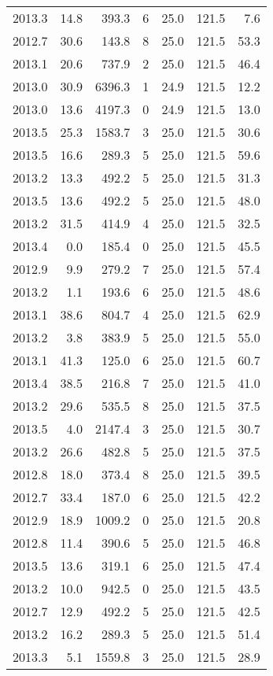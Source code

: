\begin{tabular}{rrrrrrr}
2013.3 & 14.8 & 393.3 & 6 & 25.0 & 121.5 & 7.6 \\
2012.7 & 30.6 & 143.8 & 8 & 25.0 & 121.5 & 53.3 \\
2013.1 & 20.6 & 737.9 & 2 & 25.0 & 121.5 & 46.4 \\
2013.0 & 30.9 & 6396.3 & 1 & 24.9 & 121.5 & 12.2 \\
2013.0 & 13.6 & 4197.3 & 0 & 24.9 & 121.5 & 13.0 \\
2013.5 & 25.3 & 1583.7 & 3 & 25.0 & 121.5 & 30.6 \\
2013.5 & 16.6 & 289.3 & 5 & 25.0 & 121.5 & 59.6 \\
2013.2 & 13.3 & 492.2 & 5 & 25.0 & 121.5 & 31.3 \\
2013.5 & 13.6 & 492.2 & 5 & 25.0 & 121.5 & 48.0 \\
2013.2 & 31.5 & 414.9 & 4 & 25.0 & 121.5 & 32.5 \\
2013.4 & 0.0 & 185.4 & 0 & 25.0 & 121.5 & 45.5 \\
2012.9 & 9.9 & 279.2 & 7 & 25.0 & 121.5 & 57.4 \\
2013.2 & 1.1 & 193.6 & 6 & 25.0 & 121.5 & 48.6 \\
2013.1 & 38.6 & 804.7 & 4 & 25.0 & 121.5 & 62.9 \\
2013.2 & 3.8 & 383.9 & 5 & 25.0 & 121.5 & 55.0 \\
2013.1 & 41.3 & 125.0 & 6 & 25.0 & 121.5 & 60.7 \\
2013.4 & 38.5 & 216.8 & 7 & 25.0 & 121.5 & 41.0 \\
2013.2 & 29.6 & 535.5 & 8 & 25.0 & 121.5 & 37.5 \\
2013.5 & 4.0 & 2147.4 & 3 & 25.0 & 121.5 & 30.7 \\
2013.2 & 26.6 & 482.8 & 5 & 25.0 & 121.5 & 37.5 \\
2012.8 & 18.0 & 373.4 & 8 & 25.0 & 121.5 & 39.5 \\
2012.7 & 33.4 & 187.0 & 6 & 25.0 & 121.5 & 42.2 \\
2012.9 & 18.9 & 1009.2 & 0 & 25.0 & 121.5 & 20.8 \\
2012.8 & 11.4 & 390.6 & 5 & 25.0 & 121.5 & 46.8 \\
2013.5 & 13.6 & 319.1 & 6 & 25.0 & 121.5 & 47.4 \\
2013.2 & 10.0 & 942.5 & 0 & 25.0 & 121.5 & 43.5 \\
2012.7 & 12.9 & 492.2 & 5 & 25.0 & 121.5 & 42.5 \\
2013.2 & 16.2 & 289.3 & 5 & 25.0 & 121.5 & 51.4 \\
2013.3 & 5.1 & 1559.8 & 3 & 25.0 & 121.5 & 28.9 \\

\end{tabular}
